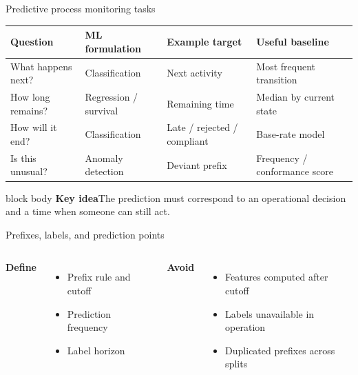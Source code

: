\documentclass[aspectratio=169,11pt]{beamer}
\newcommand{\keyidea}[1]{%
  \begin{beamercolorbox}[rounded=true,sep=0.65em]{block body}
    \textbf{\color{Teal}Key idea}\quad #1
  \end{beamercolorbox}
}
\begin{document}
\begin{frame}{Predictive process monitoring tasks}
  \small
  \begin{tabular}{@{}
    >{\raggedright\arraybackslash}p{}
    >{\raggedright\arraybackslash}p{}
    >{\raggedright\arraybackslash}p{}
    >{\raggedright\arraybackslash}p{}@{}}
    \toprule
    Question & ML formulation & Example target & Useful baseline\\
    \midrule
    What happens next? & Classification & Next activity & Most frequent transition\\
    How long remains? & Regression / survival & Remaining time & Median by current state\\
    How will it end? & Classification & Late / rejected / compliant & Base-rate model\\
    Is this unusual? & Anomaly detection & Deviant prefix & Frequency / conformance score\\
    \bottomrule
  \end{tabular}
  \vspace{0.45cm}
  \keyidea{The prediction must correspond to an operational decision and a time
  when someone can still act.}
\end{frame}

\begin{frame}{Prefixes, labels, and prediction points}
  \centering
  \vspace{0.55cm}
  \begin{columns}[T,onlytextwidth]
      \textbf{Define}
      \begin{itemize}
        \item Prefix rule and cutoff
        \item Prediction frequency
        \item Label horizon
      \end{itemize}
      \textbf{Avoid}
      \begin{itemize}
        \item Features computed after cutoff
        \item Labels unavailable in operation
        \item Duplicated prefixes across splits
      \end{itemize}
  \end{columns}
\end{frame}
\end{document}
